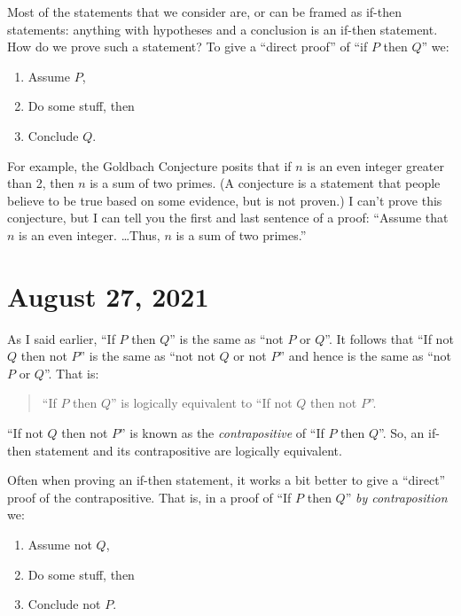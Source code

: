\documentclass[12pt]{amsart}
\numberwithin{equation}{section}
\theoremstyle{plain} %
\newcommand{\Aug}[1]{\section{August #1, 2021}}
\theoremstyle{definition}
\theoremstyle{remark}
\begin{document}
Most of the statements that we consider are, or can be framed as if-then statements: anything with hypotheses and a conclusion is an if-then statement. How do we prove such a statement? To give a ``direct proof'' of ``if $P$ then $Q$'' we:
\begin{enumerate}
	\item Assume $P$,
	\item Do some stuff, then
	\item Conclude $Q$.
\end{enumerate}

For example, the Goldbach Conjecture posits that if $n$ is an even integer greater than 2, then $n$ is a sum of two primes. (A conjecture is a statement that people believe to be true based on some evidence, but is not proven.) I can't prove this conjecture, but I can tell you the first and last sentence of a proof: ``Assume that $n$ is an even integer. \dots Thus, $n$ is a sum of two primes.''



\Aug{27}


As I said earlier, ``If $P$ then $Q$'' is the same as ``not $P$ or $Q$''. It follows that ``If not $Q$ then not $P$'' is the same as ``not not $Q$ or not $P$'' and
hence is  the same as ``not $P$ or $Q$''. That is: 
\begin{quote}
	``If $P$ then $Q$'' is logically equivalent to ``If not $Q$ then not $P$''.
\end{quote}

``If not $Q$ then not $P$'' is known as the {\em contrapositive} of 
``If $P$ then $Q$''. So, an if-then statement and its contrapositive are logically equivalent.


Often when proving an if-then statement, it works a bit better to give a ``direct'' proof of the contrapositive. That is, in a proof of ``If $P$ then $Q$'' \textit{by contraposition} we:
\begin{enumerate}
	\item Assume not $Q$,
	\item Do some stuff, then
	\item Conclude not $P$.
\end{enumerate}
\end{document}

